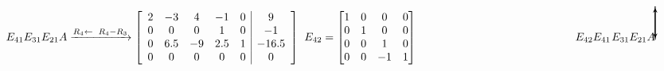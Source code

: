 \documentclass[11pt,a4paper]{article}
\begin{document}
\[
E_{41}E_{31}E_{21}A \xrightarrow{R_4 \leftarrow\tikz[remember picture]\node[minimum size= 5pt,inner sep=0pt] (D) {};R_4 - R_3}\left[{\begin{array}{ccccc|c}
                                    2 & -3 & 4 & -1 & 0 & 9\\
                                    0 & 0 & 0 & 1 & 0 & -1 \\
                                    0 & 6.5 & -9 & 2.5 & 1 & -16.5\\
                                    0 & 0 & 0 & 0 & 0 & 0
                                    \end{array}}\right] 
                                                                    
\tikz[remember picture]\node[inner sep=2pt](d) {};E_{42}=\begin{bmatrix}
            1 & 0 & 0 & 0\\ 
            0 & 1 & 0 & 0\\ 
            0 & 0 & 1 & 0\\ 
            0 & 0 & -1 & 1 
         \end{bmatrix} \hspace{5cm} E_{42}E_{41}\tikz[remember picture]\node[inner sep=0pt] (E) {};E_{31}E_{21}A
         
\tikz[overlay, remember picture]\draw[->,thick,>=stealth] (D.north) -- +(0,1) -| (d.north);
\tikz[overlay, remember picture]\draw[->,thick,>=stealth] (E.north) -- +(0,1);
         \]
\end{document}

